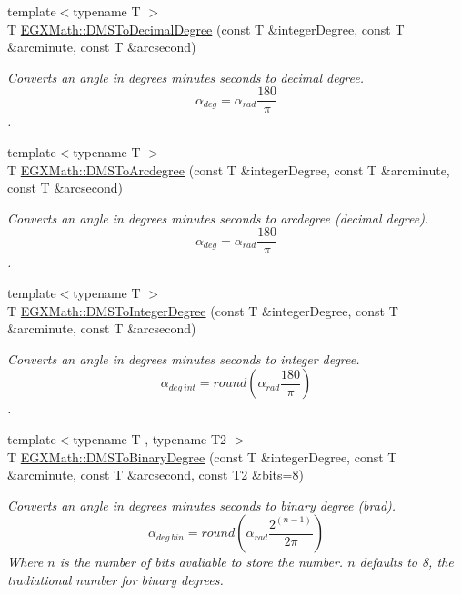 \begin{DoxyCompactItemize}
{\footnotesize template$<$typename T $>$ }\\T \mbox{\hyperlink{group___e_g_x_math-_conversions-_angle_conversions-_d_m_s_ga10e325fbb65f6e2e7d8cd7d3d8af2931}{E\+G\+X\+Math\+::\+D\+M\+S\+To\+Decimal\+Degree}} (const T \&integer\+Degree, const T \&arcminute, const T \&arcsecond)
\begin{DoxyCompactList}\small\item\em Converts an angle in degrees minutes seconds to decimal degree. \[\alpha_{deg}=\alpha_{rad}\frac{180}{\pi}\]. \end{DoxyCompactList}\item 
{\footnotesize template$<$typename T $>$ }\\T \mbox{\hyperlink{group___e_g_x_math-_conversions-_angle_conversions-_d_m_s_ga641f46ead1a3f19312aab422e569b810}{E\+G\+X\+Math\+::\+D\+M\+S\+To\+Arcdegree}} (const T \&integer\+Degree, const T \&arcminute, const T \&arcsecond)
\begin{DoxyCompactList}\small\item\em Converts an angle in degrees minutes seconds to arcdegree (decimal degree). \[\alpha_{deg}=\alpha_{rad}\frac{180}{\pi}\]. \end{DoxyCompactList}\item 
{\footnotesize template$<$typename T $>$ }\\T \mbox{\hyperlink{group___e_g_x_math-_conversions-_angle_conversions-_d_m_s_ga648345592a9116cccda50f476df28586}{E\+G\+X\+Math\+::\+D\+M\+S\+To\+Integer\+Degree}} (const T \&integer\+Degree, const T \&arcminute, const T \&arcsecond)
\begin{DoxyCompactList}\small\item\em Converts an angle in degrees minutes seconds to integer degree. \[\alpha_{deg\ int}=round(\alpha_{rad}\frac{180}{\pi})\]. \end{DoxyCompactList}\item 
{\footnotesize template$<$typename T , typename T2 $>$ }\\T \mbox{\hyperlink{group___e_g_x_math-_conversions-_angle_conversions-_d_m_s_gae0b9627dc69707dd6febb80306318d9a}{E\+G\+X\+Math\+::\+D\+M\+S\+To\+Binary\+Degree}} (const T \&integer\+Degree, const T \&arcminute, const T \&arcsecond, const T2 \&bits=8)
\begin{DoxyCompactList}\small\item\em Converts an angle in degrees minutes seconds to binary degree (brad). \[\alpha_{deg\ bin}=round(\alpha_{rad}\frac{2^{(n-1)}}{2 \pi})\] Where $n$ is the number of bits avaliable to store the number. $n$ defaults to 8, the tradiational number for binary degrees. \end{DoxyCompactList}\item 

\end{DoxyCompactItemize}
